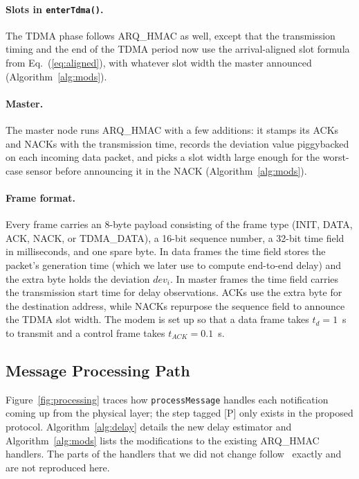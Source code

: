 \documentclass{article}
\begin{document}
\paragraph{Slots in \texttt{enterTdma()}.} The TDMA phase follows ARQ\_HMAC as well, except that the transmission timing and the end of the TDMA period now use the arrival-aligned slot formula from Eq.~(\ref{eq:aligned}), with whatever slot width the master announced (Algorithm~\ref{alg:mods}).

\paragraph{Master.} The master node runs ARQ\_HMAC with a few additions: it stamps its ACKs and NACKs with the transmission time, records the deviation value piggybacked on each incoming data packet, and picks a slot width large enough for the worst-case sensor before announcing it in the NACK (Algorithm~\ref{alg:mods}).

\paragraph{Frame format.} Every frame carries an 8-byte payload consisting of the frame type (INIT, DATA, ACK, NACK, or TDMA\_DATA), a 16-bit sequence number, a 32-bit time field in milliseconds, and one spare byte. In data frames the time field stores the packet's generation time (which we later use to compute end-to-end delay) and the extra byte holds the deviation $dev_i$. In master frames the time field carries the transmission start time for delay observations. ACKs use the extra byte for the destination address, while NACKs repurpose the sequence field to announce the TDMA slot width. The modem is set up so that a data frame takes $t_d = 1$~s to transmit and a control frame takes $t_{ACK} = 0.1$~s.

\subsection{Message Processing Path}
Figure~\ref{fig:processing} traces how \texttt{processMessage} handles each notification coming up from the physical layer; the step tagged [P] only exists in the proposed protocol. Algorithm~\ref{alg:delay} details the new delay estimator and Algorithm~\ref{alg:mods} lists the modifications to the existing ARQ\_HMAC handlers. The parts of the handlers that we did not change follow~\cite{dao2025} exactly and are not reproduced here.
\end{document}
